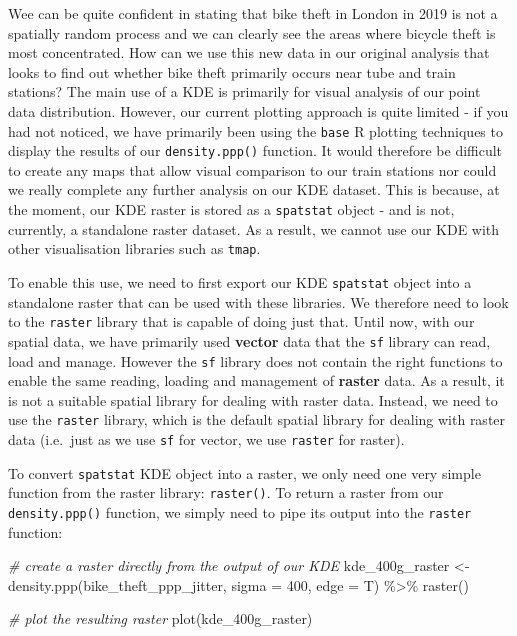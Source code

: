 \documentclass[
]{book}
\newenvironment{Shaded}{\begin{snugshade}}{\end{snugshade}}
\newcommand{\AttributeTok}[1]{\textcolor[rgb]{0.77,0.63,0.00}{#1}}
\newcommand{\CommentTok}[1]{\textcolor[rgb]{0.56,0.35,0.01}{\textit{#1}}}
\newcommand{\DecValTok}[1]{\textcolor[rgb]{0.00,0.00,0.81}{#1}}
\newcommand{\FunctionTok}[1]{\textcolor[rgb]{0.00,0.00,0.00}{#1}}
\newcommand{\NormalTok}[1]{#1}
\newcommand{\OtherTok}[1]{\textcolor[rgb]{0.56,0.35,0.01}{#1}}
\newcommand{\SpecialCharTok}[1]{\textcolor[rgb]{0.00,0.00,0.00}{#1}}
\begin{document}
Wee can be quite confident in stating that bike theft in London in 2019 is not a spatially random process and we can clearly see the areas where bicycle theft is most concentrated. How can we use this new data in our original analysis that looks to find out whether bike theft primarily occurs near tube and train stations? The main use of a KDE is primarily for visual analysis of our point data distribution. However, our current plotting approach is quite limited - if you had not noticed, we have primarily been using the \texttt{base} R plotting techniques to display the results of our \texttt{density.ppp()} function. It would therefore be difficult to create any maps that allow visual comparison to our train stations nor could we really complete any further analysis on our KDE dataset. This is because, at the moment, our KDE raster is stored as a \texttt{spatstat} object - and is not, currently, a standalone raster dataset. As a result, we cannot use our KDE with other visualisation libraries such as \texttt{tmap}.

To enable this use, we need to first export our KDE \texttt{spatstat} object into a standalone raster that can be used with these libraries. We therefore need to look to the \texttt{raster} library that is capable of doing just that. Until now, with our spatial data, we have primarily used \textbf{vector} data that the \texttt{sf} library can read, load and manage. However the \texttt{sf} library does not contain the right functions to enable the same reading, loading and management of \textbf{raster} data. As a result, it is not a suitable spatial library for dealing with raster data. Instead, we need to use the \texttt{raster} library, which is the default spatial library for dealing with raster data (i.e.~just as we use \texttt{sf} for vector, we use \texttt{raster} for raster).

To convert \texttt{spatstat} KDE object into a raster, we only need one very simple function from the raster library: \texttt{raster()}. To return a raster from our \texttt{density.ppp()} function, we simply need to pipe its output into the \texttt{raster} function:

\begin{Shaded}
\begin{Highlighting}[]
\CommentTok{\# create a raster directly from the output of our KDE}
\NormalTok{kde\_400g\_raster }\OtherTok{\textless{}{-}} \FunctionTok{density.ppp}\NormalTok{(bike\_theft\_ppp\_jitter, }\AttributeTok{sigma =} \DecValTok{400}\NormalTok{, }\AttributeTok{edge =}\NormalTok{ T) }\SpecialCharTok{\%\textgreater{}\%}
    \FunctionTok{raster}\NormalTok{()}

\CommentTok{\# plot the resulting raster}
\FunctionTok{plot}\NormalTok{(kde\_400g\_raster)}
\end{Highlighting}
\end{Shaded}
\end{document}
